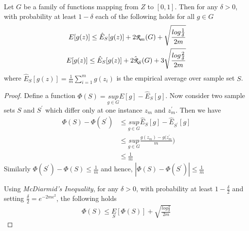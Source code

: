 \documentclass[../main]{subfiles}
\begin{document}
\begin{theorem} \label{th:rademacher_complexity}
Let $G$ be a family of functions mapping from $Z$ to $[0,1]$. Then for any $\delta>0$,
with probability at least $1-\delta$ each of the following holds for all $g \in G$
\begin{align}
E[g(z)] \leq \hat{E}_S[g(z)] + 2\cursive{R}_m(G) + \sqrt{\frac{log\frac{1}{\delta}}{2m}} \label{eq:th:rademacher_1} \\
E[g(z)] \leq \hat{E}_S[g(z)] + 2\hat{\cursive{R}}_S(G) + 3\sqrt{\frac{log\frac{2}{\delta}}{2m}} \label{eq:th:rademacher_2}
\end{align}
where $\hat{E}_S[g(z)] = \frac{1}{m} \sum_{i=1}^{m} g(z_i)$ is the empirical average over
sample set $S$.
\end{theorem}
\begin{proof}
Define a function $\Phi(S) = \underset{g \in G}{sup} E[g] - \hat{E}_S[g]$. Now consider
two sample sets $S$ and $S^\prime$ which differ only at one instance $z_m$ and $z_m^
\prime$. Then we have
\begin{align}
\Phi(S) - \Phi(S^\prime) &\leq \underset{g \in G}{sup} \hat{E}_S[g] - \hat{E}_{S^\prime}[g] \nonumber \\
&\leq \underset{g \in G}{sup} \frac{g(z_m) - g(z_m^\prime}{m}) \nonumber \\
&\leq \frac{1}{m}
\end{align}
Similarly $\Phi(S^\prime) - \Phi(S) \leq \frac{1}{m}$ and hence, $\left| \Phi(S) - \Phi(S^\prime)\right| \leq \frac{1}{m}$

Using \textit{McDiarmid's Inequality}, for any $\delta > 0$, with probability at least
$1-\frac{\delta}{2}$ and setting $\frac{\delta}{2} = e^{-2m\epsilon^2}$, the following holds
\begin{align}
\Phi(S) \leq \underset{S}{E}[\Phi(S)] + \sqrt{\frac{log\frac{2}{\delta}}{2m}} \label{eq:ramemacher_proof_phi}
\end{align}


\end{proof}
\end{document}
